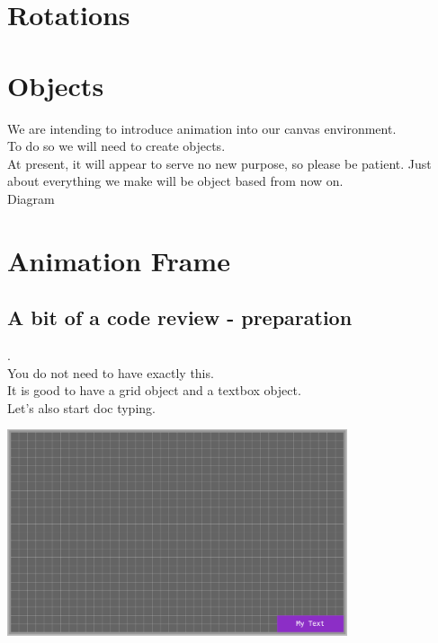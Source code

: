 \documentclass[a4paper,12pt]{article}
\begin{document}
\section{Rotations}
\newpage
\section{Objects}
We are intending to introduce animation into our canvas environment.\\
To do so we will need to create objects.\\
At present, it will appear to serve no new purpose, so please be patient. Just about everything we make will be object based from now on.\\
Diagram\\



\newpage
\section{Animation Frame}
\subsection{A bit of a code review - preparation}.\\
You do not need to have exactly this.\\

It is good to have a grid object and a textbox object.\\
Let's also start doc typing.


\begin{center}
	\includegraphics[width=10cm, angle=0, origin=c]{animationframe/start_up.png}
\end{center}
\newpage
\end{document}
